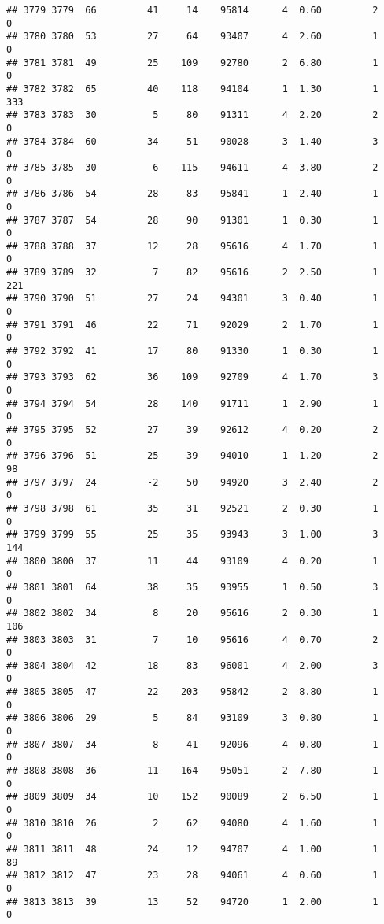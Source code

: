 \documentclass[
]{article}
\begin{document}
\begin{verbatim}
## 3779 3779  66         41     14    95814      4  0.60         2        0
## 3780 3780  53         27     64    93407      4  2.60         1        0
## 3781 3781  49         25    109    92780      2  6.80         1        0
## 3782 3782  65         40    118    94104      1  1.30         1      333
## 3783 3783  30          5     80    91311      4  2.20         2        0
## 3784 3784  60         34     51    90028      3  1.40         3        0
## 3785 3785  30          6    115    94611      4  3.80         2        0
## 3786 3786  54         28     83    95841      1  2.40         1        0
## 3787 3787  54         28     90    91301      1  0.30         1        0
## 3788 3788  37         12     28    95616      4  1.70         1        0
## 3789 3789  32          7     82    95616      2  2.50         1      221
## 3790 3790  51         27     24    94301      3  0.40         1        0
## 3791 3791  46         22     71    92029      2  1.70         1        0
## 3792 3792  41         17     80    91330      1  0.30         1        0
## 3793 3793  62         36    109    92709      4  1.70         3        0
## 3794 3794  54         28    140    91711      1  2.90         1        0
## 3795 3795  52         27     39    92612      4  0.20         2        0
## 3796 3796  51         25     39    94010      1  1.20         2       98
## 3797 3797  24         -2     50    94920      3  2.40         2        0
## 3798 3798  61         35     31    92521      2  0.30         1        0
## 3799 3799  55         25     35    93943      3  1.00         3      144
## 3800 3800  37         11     44    93109      4  0.20         1        0
## 3801 3801  64         38     35    93955      1  0.50         3        0
## 3802 3802  34          8     20    95616      2  0.30         1      106
## 3803 3803  31          7     10    95616      4  0.70         2        0
## 3804 3804  42         18     83    96001      4  2.00         3        0
## 3805 3805  47         22    203    95842      2  8.80         1        0
## 3806 3806  29          5     84    93109      3  0.80         1        0
## 3807 3807  34          8     41    92096      4  0.80         1        0
## 3808 3808  36         11    164    95051      2  7.80         1        0
## 3809 3809  34         10    152    90089      2  6.50         1        0
## 3810 3810  26          2     62    94080      4  1.60         1        0
## 3811 3811  48         24     12    94707      4  1.00         1       89
## 3812 3812  47         23     28    94061      4  0.60         1        0
## 3813 3813  39         13     52    94720      1  2.00         1        0

\end{verbatim}
\end{document}
